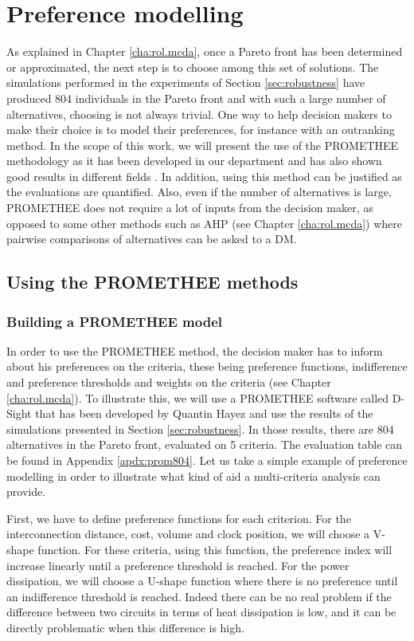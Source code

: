 \section{Preference modelling}
As explained in Chapter \ref{cha:rol.mcda}, once a Pareto front has been determined or approximated, the next step is to choose among this set of solutions. The simulations performed in the experiments of Section \ref{sec:robustness} have produced 804 individuals in the Pareto front and with such a large number of alternatives, choosing is not always trivial. One way to help decision makers to make their choice is to model their preferences, for instance with an outranking method. In the scope of this work, we will present the use of the PROMETHEE methodology as it has been developed in our department and has also shown good results in different fields \cite{Beh2010}. In addition, using this method can be justified as the evaluations are quantified. Also, even if the number of alternatives is large, PROMETHEE does not require a lot of inputs from the decision maker, as opposed to some other methods such as AHP (see Chapter \ref{cha:rol.mcda}) where pairwise comparisons of alternatives can be asked to a DM.

\subsection{Using the PROMETHEE methods}

\subsubsection{Building a PROMETHEE model}
In order to use the PROMETHEE method, the decision maker has to inform about his preferences on the criteria, these being preference functions, indifference and preference thresholds and weights on the criteria (see Chapter \ref{cha:rol.mcda}). To illustrate this, we will use a PROMETHEE software called D-Sight that has been developed by Quantin Hayez and use the results of the simulations presented in Section \ref{sec:robustness}. In those results, there are 804 alternatives in the Pareto front, evaluated on 5 criteria. The evaluation table can be found in Appendix \ref{apdx:prom804}. Let us take a simple example of preference modelling in order to illustrate what kind of aid a multi-criteria analysis can provide.

First, we have to define preference functions for each criterion. For the interconnection distance, cost, volume and clock position, we will choose a V-shape function. For these criteria, using this function, the preference index will increase linearly until a preference threshold is reached. For the power dissipation, we will choose a U-shape function where there is no preference until an indifference threshold is reached. Indeed there can be no real problem if the difference between two circuits in terms of heat dissipation is low, and it can be directly problematic when this difference is high.

